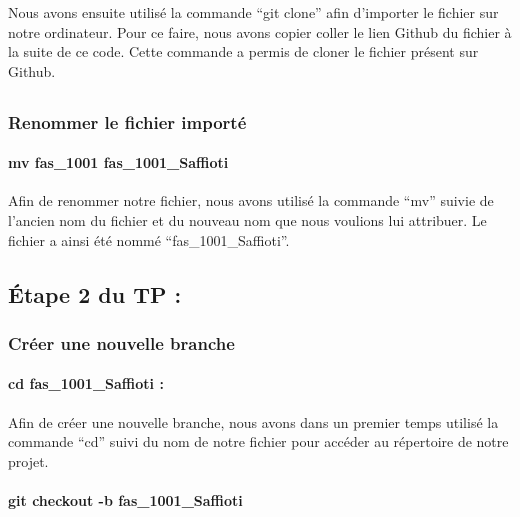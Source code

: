 \documentclass[
  letterpaper,
  DIV=11,
  numbers=noendperiod]{scrartcl}
\let\oldparagraph\paragraph
\renewcommand{\paragraph}[1]{\oldparagraph{#1}\mbox{}}
\begin{document}
Nous avons ensuite utilisé la commande ``git clone'' afin d'importer le
fichier sur notre ordinateur. Pour ce faire, nous avons copier coller le
lien Github du fichier à la suite de ce code. Cette commande a permis de
cloner le fichier présent sur Github.

\hypertarget{section}{%
\subsection{}\label{section}}

\hypertarget{renommer-le-fichier-importuxe9}{%
\subsubsection{Renommer le fichier
importé}\label{renommer-le-fichier-importuxe9}}

\hypertarget{mv-fas_1001-fas_1001_saffioti}{%
\paragraph{mv fas\_1001
fas\_1001\_Saffioti}\label{mv-fas_1001-fas_1001_saffioti}}

Afin de renommer notre fichier, nous avons utilisé la commande ``mv''
suivie de l'ancien nom du fichier et du nouveau nom que nous voulions
lui attribuer. Le fichier a ainsi été nommé ``fas\_1001\_Saffioti''.

\hypertarget{uxe9tape-2-du-tp}{%
\subsection{Étape 2 du TP :}\label{uxe9tape-2-du-tp}}

\hypertarget{cruxe9er-une-nouvelle-branche}{%
\subsubsection{Créer une nouvelle
branche}\label{cruxe9er-une-nouvelle-branche}}

\hypertarget{cd-fas_1001_saffioti}{%
\paragraph{cd fas\_1001\_Saffioti :}\label{cd-fas_1001_saffioti}}

Afin de créer une nouvelle branche, nous avons dans un premier temps
utilisé la commande ``cd'' suivi du nom de notre fichier pour accéder au
répertoire de notre projet.

\hypertarget{git-checkout--b-fas_1001_saffioti}{%
\paragraph{git checkout -b
fas\_1001\_Saffioti}\label{git-checkout--b-fas_1001_saffioti}}
\end{document}
